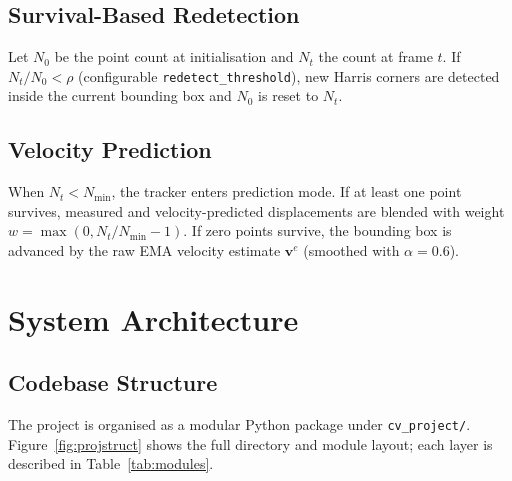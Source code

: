 \documentclass[12pt,a4paper]{article}
\begin{document}
\subsection{Survival-Based Redetection}
Let $N_0$ be the point count at initialisation and $N_t$ the count at frame $t$. If
$N_t/N_0 < \rho$ (configurable \texttt{redetect\_threshold}), new Harris corners are detected
inside the current bounding box and $N_0$ is reset to $N_t$.

\subsection{Velocity Prediction}
When $N_t < N_{\min}$, the tracker enters prediction mode. If at least one point survives,
measured and velocity-predicted displacements are blended with weight
$w = \max(0, N_t/N_{\min}-1)$. If zero points survive, the bounding box is advanced by the raw
EMA velocity estimate $\mathbf{v}^e$ (smoothed with $\alpha=0.6$).

\section{System Architecture}

\subsection{Codebase Structure}
The project is organised as a modular Python package under \texttt{cv\_project/}.
Figure~\ref{fig:projstruct} shows the full directory and module layout; each layer is
described in Table~\ref{tab:modules}.
\end{document}

